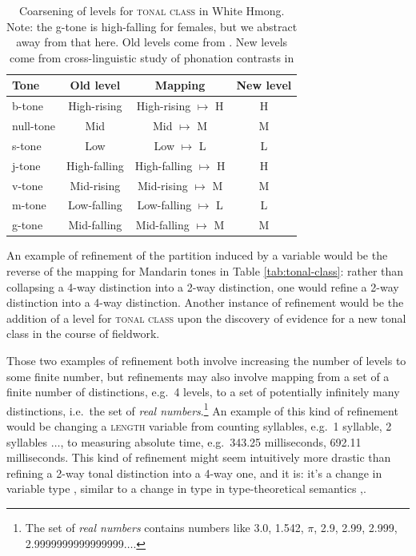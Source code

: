 \documentclass[12pt]{article}
\begin{document}
\begin{table}[h]
  \centering
  \begin{tabular}{l | c c c}
    Tone & Old level & Mapping & New level\\\hline
    b-tone & High-rising & High-rising $\mapsto$ H & H  \\
    null-tone & Mid & Mid $\mapsto$ M & M  \\
    s-tone & Low & Low $\mapsto$ L & L \\
    j-tone & High-falling & High-falling $\mapsto$ H &H \\
    v-tone & Mid-rising & Mid-rising $\mapsto$ M & M\\
    m-tone & Low-falling & Low-falling $\mapsto$ L & L   \\
    g-tone & Mid-falling & Mid-falling  $\mapsto$ M & M\\
  \end{tabular}
  \caption{Coarsening of levels for \textsc{tonal class} in White Hmong. Note: the g-tone is
    high-falling for females, but we abstract away from that here. Old
    levels come from \citet{Esposito:2009,Esposito:2012}. New levels
    come from
    cross-linguistic study of phonation contrasts in \citet{Keating:2011}}
  \label{tab:hmong-tones}
\end{table}

An example of refinement of the partition induced by a variable would
be the reverse of the mapping for Mandarin tones in Table
\ref{tab:tonal-class}: rather than collapsing a 4-way distinction into
a 2-way distinction, one would refine a 2-way distinction into a 4-way
distinction. Another instance of refinement would be the addition of a
level for \textsc{tonal class} upon the discovery of 
evidence for a new tonal class in the course of fieldwork. 

Those two examples of refinement both involve increasing the number of
levels to some finite number, but refinements may also involve
mapping from a set of a finite number of distinctions, e.g.\ 4
levels, to a set of potentially infinitely many distinctions, i.e.\
the set of \textit{real numbers}.\footnote{The set of \textit{real
    numbers} contains numbers like 3.0, 1.542, $\pi$, 2.9, 2.99, 2.999,
  2.9999999999999999$\ldots$.} An
example of this kind of refinement would be changing a \textsc{length}
variable from counting syllables, e.g.\ 1 syllable, 2 syllables
$\ldots$, to measuring absolute time, e.g.\ 343.25 milliseconds,
692.11 milliseconds. This kind of refinement might seem intuitively more
drastic than refining a 2-way tonal distinction into a 4-way one, and
it is: it's a change in variable type \citep{Stevens:1937}, similar to a
change in type in type-theoretical semantics \citep[Ch.\
4]{Gamut:1992},\citep[Chs.\ 2, 3]{Carpenter:1997}. 
\end{document}
